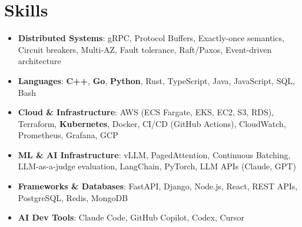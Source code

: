 \documentclass[letterpaper,11pt]{article}
\newcommand{\resumeSubHeadingListStart}{\begin{itemize}[leftmargin=0.15in, label={}]}
\newcommand{\resumeSubHeadingListEnd}{\end{itemize}}
\newcommand{\resumeSkillHeading}[2]{%
  \item\small{\textbf{#1}: #2 \vspace{-9pt}}%
}
\begin{document}
\section{Skills}
  \resumeSubHeadingListStart
    \resumeSkillHeading{Distributed Systems}{gRPC, Protocol Buffers, Exactly-once semantics, Circuit breakers, Multi-AZ, Fault tolerance, Raft/Paxos, Event-driven architecture}
    \resumeSkillHeading{Languages}{\textbf{C++}, \textbf{Go}, \textbf{Python}, Rust, TypeScript, Java, JavaScript, SQL, Bash}
    \resumeSkillHeading{Cloud \& Infrastructure}{AWS (ECS Fargate, EKS, EC2, S3, RDS), Terraform, \textbf{Kubernetes}, Docker, CI/CD (GitHub Actions), CloudWatch, Prometheus, Grafana, GCP}
    \resumeSkillHeading{ML \& AI Infrastructure}{vLLM, PagedAttention, Continuous Batching, LLM-as-a-judge evaluation, LangChain, PyTorch, LLM APIs (Claude, GPT)}
    \resumeSkillHeading{Frameworks \& Databases}{FastAPI, Django, Node.js, React, REST APIs, PostgreSQL, Redis, MongoDB}
    \resumeSkillHeading{AI Dev Tools}{Claude Code, GitHub Copilot, Codex, Cursor}
  \resumeSubHeadingListEnd
\end{document}
